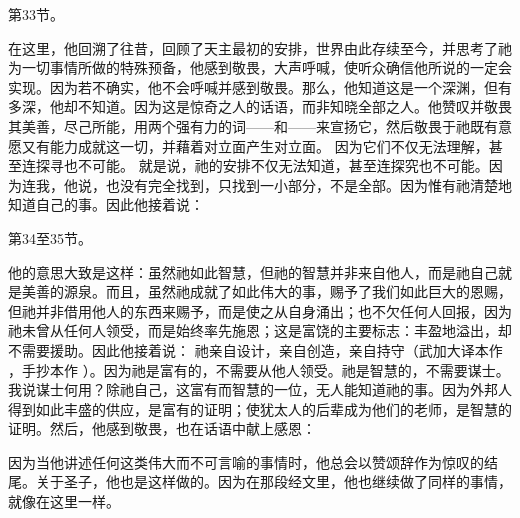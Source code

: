 第33节。  \par

在这里，他回溯了往昔，回顾了天主最初的安排，世界由此存续至今，并思考了祂为一切事情所做的特殊预备，他感到敬畏，大声呼喊，使听众确信他所说的一定会实现。因为若不确实，他不会呼喊并感到敬畏。那么，他知道这是一个深渊，但有多深，他却不知道。因为这是惊奇之人的话语，而非知晓全部之人。他赞叹并敬畏其美善，尽己所能，用两个强有力的词——和——来宣扬它，然后敬畏于祂既有意愿又有能力成就这一切，并藉着对立面产生对立面。  因为它们不仅无法理解，甚至连探寻也不可能。  就是说，祂的安排不仅无法知道，甚至连探究也不可能。因为连我，他说，也没有完全找到，只找到一小部分，不是全部。因为惟有祂清楚地知道自己的事。因此他接着说：\par

第34至35节。  \par

他的意思大致是这样：虽然祂如此智慧，但祂的智慧并非来自他人，而是祂自己就是美善的源泉。而且，虽然祂成就了如此伟大的事，赐予了我们如此巨大的恩赐，但祂并非借用他人的东西来赐予，而是使之从自身涌出；也不欠任何人回报，因为祂未曾从任何人领受，而是始终率先施恩；这是富饶的主要标志：丰盈地溢出，却不需要援助。因此他接着说：   祂亲自设计，亲自创造，亲自持守（武加大译本作 ，手抄本作 ）。因为祂是富有的，不需要从他人领受。祂是智慧的，不需要谋士。我说谋士何用？除祂自己，这富有而智慧的一位，无人能知道祂的事。因为外邦人得到如此丰盛的供应，是富有的证明；使犹太人的后辈成为他们的老师，是智慧的证明。然后，他感到敬畏，也在话语中献上感恩： \par

因为当他讲述任何这类伟大而不可言喻的事情时，他总会以赞颂辞作为惊叹的结尾。关于圣子，他也是这样做的。因为在那段经文里，他也继续做了同样的事情，就像在这里一样。\par


